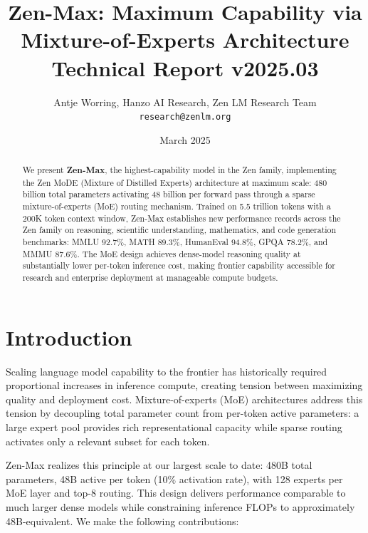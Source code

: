 \documentclass[11pt,a4paper]{article}
\title{\textbf{Zen-Max: Maximum Capability via Mixture-of-Experts Architecture}\\
\large Technical Report v2025.03}
\author{Antje Worring, Hanzo AI Research, Zen LM Research Team\\
\texttt{research@zenlm.org}}
\date{March 2025}
\begin{document}
\maketitle

\begin{abstract}
We present \textbf{Zen-Max}, the highest-capability model in the Zen family, implementing the
Zen MoDE (Mixture of Distilled Experts) architecture at maximum scale: 480 billion total
parameters activating 48 billion per forward pass through a sparse mixture-of-experts (MoE)
routing mechanism. Trained on 5.5 trillion tokens with a 200K token context window, Zen-Max
establishes new performance records across the Zen family on reasoning, scientific understanding,
mathematics, and code generation benchmarks: MMLU 92.7\%, MATH 89.3\%, HumanEval 94.8\%,
GPQA 78.2\%, and MMMU 87.6\%. The MoE design achieves dense-model reasoning quality at
substantially lower per-token inference cost, making frontier capability accessible for research
and enterprise deployment at manageable compute budgets.
\end{abstract}

\tableofcontents
\newpage

\section{Introduction}

Scaling language model capability to the frontier has historically required proportional
increases in inference compute, creating tension between maximizing quality and deployment
cost. Mixture-of-experts (MoE) architectures \cite{shazeer2017outrageously, fedus2022switch}
address this tension by decoupling total parameter count from per-token active parameters:
a large expert pool provides rich representational capacity while sparse routing activates
only a relevant subset for each token.

Zen-Max realizes this principle at our largest scale to date: 480B total parameters, 48B
active per token (10\% activation rate), with 128 experts per MoE layer and top-8 routing.
This design delivers performance comparable to much larger dense models while constraining
inference FLOPs to approximately 48B-equivalent. We make the following contributions:
\end{document}
